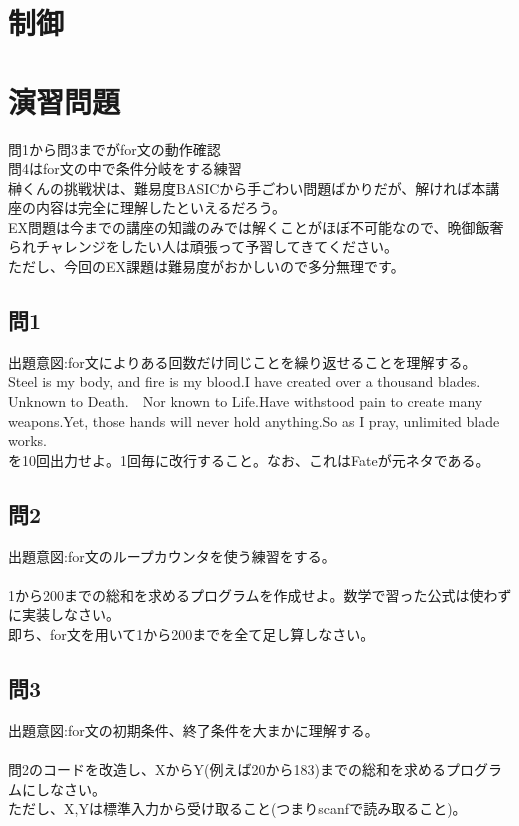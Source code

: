 \documentclass[a4j,titlepage,dvipdfmx]{jsarticle}   %
\begin{document}
\section{制御}
\section{演習問題}
問1から問3までがfor文の動作確認\\
問4はfor文の中で条件分岐をする練習\\
榊くんの挑戦状は、難易度BASICから手ごわい問題ばかりだが、解ければ本講座の内容は完全に理解したといえるだろう。\\
EX問題は今までの講座の知識のみでは解くことがほぼ不可能なので、晩御飯奢られチャレンジをしたい人は頑張って予習してきてください。\\
ただし、今回のEX課題は難易度がおかしいので多分無理です。\\

\subsection{問1}
出題意図:for文によりある回数だけ同じことを繰り返せることを理解する。\\

Steel is my body, and fire is my blood.I have created over a thousand blades.　Unknown to Death.　Nor known to Life.Have withstood pain to create many weapons.Yet, those hands will never hold anything.So as I pray, unlimited blade works.\\
を10回出力せよ。1回毎に改行すること。なお、これはFateが元ネタである。\\

\subsection{問2}
出題意図:for文のループカウンタを使う練習をする。\\
\\
1から200までの総和を求めるプログラムを作成せよ。数学で習った公式は使わずに実装しなさい。\\
即ち、for文を用いて1から200までを全て足し算しなさい。\\

\subsection{問3}
出題意図:for文の初期条件、終了条件を大まかに理解する。\\
\\
問2のコードを改造し、XからY(例えば20から183)までの総和を求めるプログラムにしなさい。\\
ただし、X,Yは標準入力から受け取ること(つまりscanfで読み取ること)。\\
\end{document}
